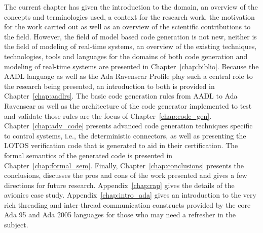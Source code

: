 The current chapter has given the introduction to the domain, an
overview of the concepts and terminologies used, a context for the
research work, the motivation for the work carried out as well as an
overview of the scientific contributions to the field. However, the
field of model based code generation is not new, neither is the field
of modeling of real-time systems, an overview of the existing
techniques, technologies, tools and languages for the domains of both
code generation and modeling of real-time systems are presented in
Chapter~\ref{chap:biblio}. Because the AADL language as well as the
Ada Ravenscar Profile play such a central role to the research being
presented, an introduction to both is provided in
Chapter~\ref{chap:aadlrs}. The basic code generation rules from AADL
to Ada Ravenscar as well as the architecture of the code generator
implemented to test and validate those rules are the focus of
Chapter~\ref{chap:code_gen}. Chapter~\ref{chap:adv_code} presents
advanced code generation techniques specific to control systems, i.e.,
the deterministic connectors, as well as presenting the LOTOS
verification code that is generated to aid in their certification. The
formal semantics of the generated code is presented in
Chapter~\ref{chap:formal_sem}. Finally, Chapter~\ref{chap:conclusions}
presents the conclusions, discusses the pros and cons of the work
presented and gives a few directions for future
research. Appendix~\ref{chap:rap} gives the details of the avionics
case study. Appendix~\ref{chap:intro_ada} gives an introduction to the
very rich threading and inter-thread communication constructs provided
by the core Ada 95 and Ada 2005 languages for those who may need a
refresher in the subject.

